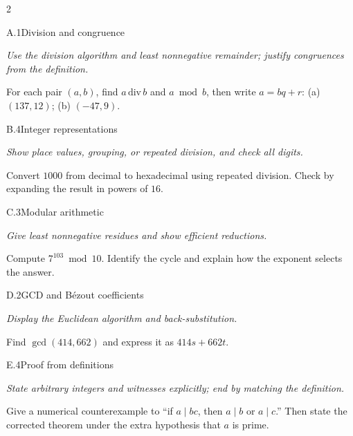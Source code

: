 \documentclass[9pt]{extarticle}
\begin{document}
\begin{multicols}{2}
\begin{CoreProblem}{A.1}{Division and congruence}
{\scriptsize\textit{Use the division algorithm and least nonnegative remainder; justify congruences from the definition.}\par}
For each pair $(a,b)$, find $a\,\mathrm{div}\,b$ and $a\bmod b$, then write
$a=bq+r$: (a) $(137,12)$; (b) $(-47,9)$.
\end{CoreProblem}
\begin{CoreProblem}{B.4}{Integer representations}
{\scriptsize\textit{Show place values, grouping, or repeated division, and check all digits.}\par}
Convert $1000$ from decimal to hexadecimal using repeated division. Check by
expanding the result in powers of $16$.
\end{CoreProblem}
\begin{CoreProblem}{C.3}{Modular arithmetic}
{\scriptsize\textit{Give least nonnegative residues and show efficient reductions.}\par}
Compute $7^{103}\bmod10$. Identify the cycle and explain how the exponent
selects the answer.
\end{CoreProblem}
\columnbreak
\begin{CoreProblem}{D.2}{GCD and B\'ezout coefficients}
{\scriptsize\textit{Display the Euclidean algorithm and back-substitution.}\par}
Find $\gcd(414,662)$ and express it as $414s+662t$.
\end{CoreProblem}
\begin{CoreProblem}{E.4}{Proof from definitions}
{\scriptsize\textit{State arbitrary integers and witnesses explicitly; end by matching the definition.}\par}
Give a numerical counterexample to ``if $a\mid bc$, then $a\mid b$ or
$a\mid c$.'' Then state the corrected theorem under the extra hypothesis that
$a$ is prime.
\end{CoreProblem}
\end{multicols}
\CoreWorkArea
\FormBreak
{}
\end{document}

